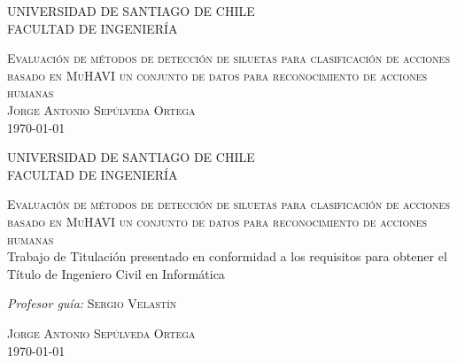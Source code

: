 \begin{titlepage}
\begin{center}
\textsc{UNIVERSIDAD DE SANTIAGO DE CHILE}\\ 
\textsc{FACULTAD DE INGENIERÍA}\\ 
\null %
\null
\null


\vspace*{\fill}
\textsc{Evaluación de métodos de detección de siluetas para clasificación de acciones basado en MuHAVI un conjunto de datos para reconocimiento de acciones humanas}\\[0.5cm]
\vspace*{\fill}
\vfill
\textsc{Jorge Antonio Sepúlveda Ortega}\\ %
{\large \today}  %
\end{center}
\end{titlepage}
\newpage\thispagestyle{empty}\mbox{}

\begin{titlepage}
\begin{center}
\textsc{UNIVERSIDAD DE SANTIAGO DE CHILE}\\ 
\textsc{FACULTAD DE INGENIERÍA}\\ 
\null %

\null
\null
\vfill


\vspace*{\fill}
\textsc{Evaluación de métodos de detección de siluetas para clasificación de acciones basado en MuHAVI un conjunto de datos para reconocimiento de acciones humanas}\\[0.5cm]
Trabajo de Titulación presentado en conformidad a los requisitos  para obtener el Título de Ingeniero Civil en Informática
\vspace*{\fill}

\begin{minipage}[c]{0.5 \textwidth}
\begin{flushright}
\emph{Profesor guía:} \textsc{Sergio Velastín}
\end{flushright}
\end{minipage}


\vfill
\textsc{Jorge Antonio Sepúlveda Ortega}\\ %
{\large \today} %
\end{center}
\end{titlepage}

\newpage\thispagestyle{empty}\mbox{}
\restoregeometry
